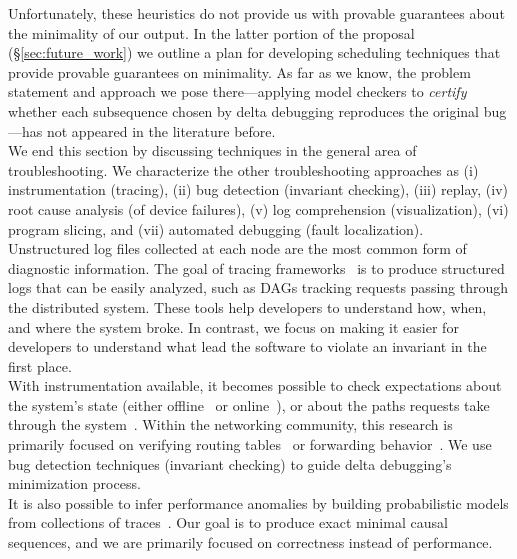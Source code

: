 Unfortunately, these heuristics do not provide us with provable guarantees
about the minimality of our output. In the latter portion of the
proposal (\S\ref{sec:future_work}) we outline a plan for
developing scheduling techniques that provide provable guarantees on
minimality. As far as we know, the problem statement and approach we pose there---applying model checkers
to {\em certify} whether each subsequence chosen by delta debugging reproduces
the original bug---has not appeared in the literature before.\\[0.5ex]
%
 We end this section by discussing
techniques in the general area of troubleshooting. We characterize the other troubleshooting approaches
as (i) instrumentation (tracing),
(ii) bug detection (invariant checking),
(iii) replay,
(iv) root cause analysis (of device failures), (v) log comprehension
(visualization), (vi) program slicing, and (vii) automated debugging (fault
localization).\\[0.5ex]
%
 Unstructured
log files collected at each node are the most common form of diagnostic information. The goal of
tracing frameworks~\cite{pip,fonseca2007x,Chen02pinpoint:problem,ndb14,barham2004using}
is to produce structured logs that can be easily analyzed, such as DAGs tracking
requests passing through the distributed system. These tools help developers to understand
how, when, and where the system broke. In contrast, we focus on making it
easier for developers to understand what lead the software
to violate an invariant in the first place.\\[0.5ex]
%
 With instrumentation available, it becomes possible
to check expectations about the
system's state (either offline~\cite{Liu07widschecker} or online~\cite{d3s}), or about the paths requests take through
the system~\cite{pip}. Within the networking community, this research is
primarily focused on verifying routing tables~\cite{hsa,hsa_realtime,anteater,khurshid2012veriflow}
or forwarding behavior~\cite{Zeng:2012:ATP:2413176.2413205,libra}.
We use bug detection techniques (invariant checking) to guide delta debugging's minimization
process.\\[0.5ex]
%
It is also possible to infer
performance anomalies by building probabilistic models from
collections of traces~\cite{barham2004using,Chen02pinpoint:problem}.
Our goal is to produce exact minimal causal sequences, and we are primarily focused on
correctness instead of performance.\\[0.5ex]
